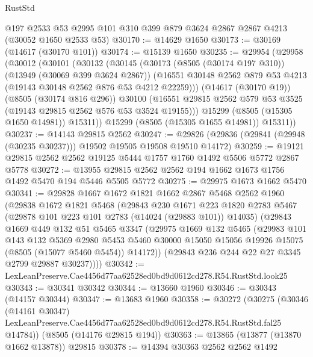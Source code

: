 \begin{lexlean}{RustStd}
\begin{coremodule}
    @197
    @2533
    @53
    @2995
    @101
    @310
    @399
    @879
    @3624
    @2867
    @2867
    @4213
    (@30052 @1650 @2533 @53)
@30170 := @14629 @1650
@30173 := @30169 (@14617 (@30170 @101))
@30174 := @15139 @1650
@30235 := @29954
    (@29958
      (@30012
        (@30101
          (@30132
            (@30145
              (@30173
                (@8505 (@30174 @197 @310))
                (@13949 (@30069 @399 @3624 @2867))
                (@16551 @30148 @2562 @879 @53 @4213 (@19143 @30148 @2562 @876 @53 @4212 @22259)))
              (@14617 (@30170 @19))
              (@8505 (@30174 @816 @296))
              @30100
              (@16551 @29815 @2562 @579 @53 @3525 (@19143 @29815 @2562 @576 @53 @3524 @19155)))
            @15299
            (@8505 (@15305 @1650 @14981))
            @15311))
        @15299
        (@8505 (@15305 @1655 @14981))
        @15311))
@30237 := @14143 @29815 @2562
@30247 := @29826 (@29836 (@29841 (@29948 (@30235 @30237))) @19502 @19505 @19508 @19510 @14172)
@30259 := @19121 @29815 @2562 @2562 @19125 @5444 @1757 @1760 @1492 @5506 @5772 @2867 @5778
@30272 := @13955 @29815 @2562 @2562 @194 @1662 @1673 @1756 @1492 @5470 @194 @5446 @5505 @5772
@30275 := @29975 @1673 @1662 @5470
@30341 := @29828
    @1667
    @1672
    @1821
    @1662
    @2867
    @5468
    @2562
    @1960
    (@29838
      @1672
      @1821
      @5468
      (@29843
        @230
        @1671
        @223
        @1820
        @2783
        @5467
        (@29878 @101 @223 @101 @2783 (@14024 (@29883 @101)) @14035)
        (@29843
          @1669
          @449
          @132
          @51
          @5465
          @3347
          (@29975
            @1669
            @132
            @5465
            (@29983
              @101
              @143
              @132
              @5369
              @2980
              @5453
              @5460
              @30000
              @15050
              @15056
              @19926
              @15075
              (@8505 (@15077 @5460 @5454))
              @14172))
          (@29843 @236 @244 @22 @27 @3345 @2799 @29887 @30237))))
@30342 := LexLeanPreserve.Cae4456d77aa62528ed0bd9d0612cd278.R54.RustStd.look25
@30343 := @30341 @30342
@30344 := @13660 @1960
@30346 := @30343 (@14157 @30344)
@30347 := @13683 @1960
@30358 := @30272
    (@30275
      (@30346
        (@14161 @30347)
        LexLeanPreserve.Cae4456d77aa62528ed0bd9d0612cd278.R54.RustStd.fal25
        @14784))
    (@8505 (@14176 @29815 @194))
@30363 := @13865 (@13877 (@13870 @1662 @13878)) @29815
@30378 := @14394
    @30363
    @2562
    @2562
    @1492

\end{coremodule}
\end{lexlean}

